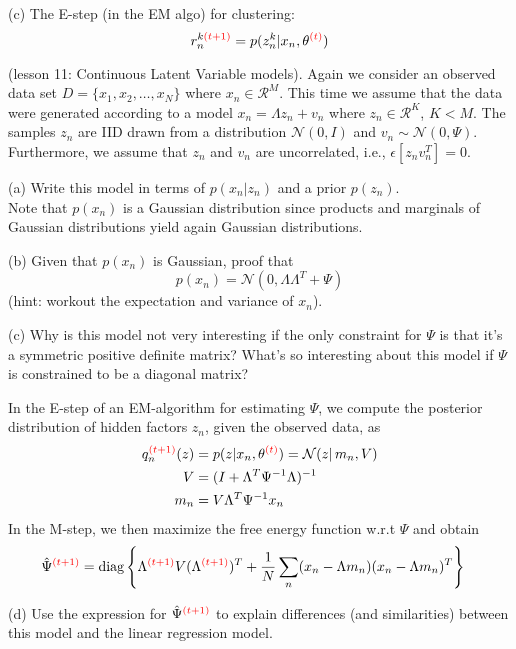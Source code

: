 \documentclass[a4paper]{article}
\newcommand{\N}{\mathcal{N}}
\newcommand{\mc}[1]{\mathcal{#1}}
\def\r#1{{\color{red}#1}}
\begin{document}
\begin{ExerciseList}
(c) The E-step (in the EM algo) for clustering:
 $$r_n^{k\r{(t+1)}} = p(z_n^k|x_n,\theta^{\r{(t)}})$$





\Exercise[label={ex:6}]  (lesson 11: Continuous Latent Variable models). 
Again we consider an observed data set $D = \{x_1,x_2,\ldots,x_N\}$ where $x_n \in \mc{R}^M$.  This time we assume that the data were generated according to a model $x_n = \Lambda z_n + v_n$ where $z_n \in \mc{R}^K$, $K<M$. The samples $z_n$ are IID drawn from a distribution $\mc{N}(0,I)$ and $v_n \sim \mc{N}(0,\Psi)$. Furthermore, we assume that $z_n$ and $v_n$ are uncorrelated, i.e., $\epsilon[z_nv_n^T]=0$.

\medskip
(a) Write this model in terms of $p(x_n|z_n)$ and a prior $p(z_n)$.\\

\medskip
Note that $p(x_n)$ is a Gaussian distribution since products and marginals of Gaussian distributions yield again Gaussian distributions.

(b) Given that $p(x_n)$ is Gaussian, proof that
$$p(x_n) = \mc{N}(0,\Lambda \Lambda^T +\Psi)$$
(hint: workout the expectation and variance of $x_n$).

(c) Why is this model not very interesting if the only constraint for $\Psi$ is that it's a symmetric positive definite matrix? What's so interesting about this model if $\Psi$ is constrained to be a diagonal matrix?

\medskip
In the E-step of an EM-algorithm for estimating $\Psi$, we compute the posterior distribution of hidden factors $z_n$, given the observed data, as
\begin{align*}
q_n^{\r{(t+1)}}(z) &= p(z|x_n,\theta^{\r{(t)}}) = \N(z|\,m_n,V)\\
    V &= (I + \Lambda^T \Psi^{-1} \Lambda)^{-1} \\
    m_n &= V \Lambda^T \Psi^{-1} x_n
    \end{align*}
In the M-step, we then maximize the free energy function w.r.t $\Psi$ and obtain
\begin{align*}
\hat \Psi^{\r{(t+1)}} &= \text{diag}\left\{\Lambda^{\r{(t+1)}} V (\Lambda^{\r{(t+1)}})^T + \frac{1}{N} \sum_n (x_n-\Lambda m_n)(x_n-\Lambda m_n)^T \right\}
\end{align*}

(d) Use the expression for $\hat \Psi^{\r{(t+1)}}$ to explain differences (and similarities) between this model and the linear regression model.




\end{ExerciseList}
\end{document}

